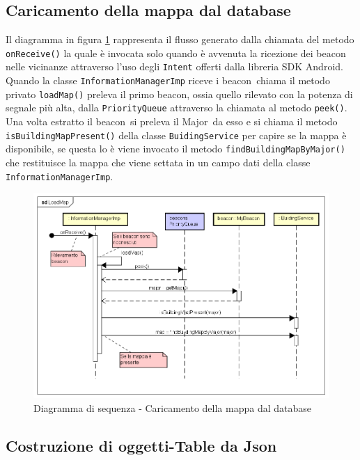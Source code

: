\documentclass[../DefinizioneDiProdotto.tex]{subfiles}
\begin{document}
	\newpage
	\subsection{Caricamento della mappa dal database}
		
		Il diagramma in figura \ref{fig:LoadMap} rappresenta il flusso generato dalla chiamata del metodo \verb|onReceive()| la quale è invocata solo quando è avvenuta la ricezione dei beacon nelle vicinanze attraverso l'uso degli \verb|Intent| offerti dalla libreria SDK Android. Quando la classe \verb|InformationManagerImp| riceve i beacon\g\ chiama il metodo privato \verb|loadMap()| preleva il primo beacon\g, ossia quello rilevato con la potenza di segnale più alta, dalla \verb|PriorityQueue| attraverso la chiamata al metodo \verb|peek()|. Una volta estratto il beacon\g\ si preleva il Major\g\ da esso e si chiama il metodo \verb|isBuildingMapPresent()| della classe \verb|BuidingService| per capire se la mappa è disponibile, se questa lo è viene invocato il metodo \verb|findBuildingMapByMajor()| che restituisce la mappa che viene settata in un campo dati della classe \verb|InformationManagerImp|.
		
		\begin{figure} [h]
			\centering
			\includegraphics[width=\textwidth]{diagrams/LoadMap}
			\caption{Diagramma di sequenza - Caricamento della mappa dal database}
			\label{fig:LoadMap}
		\end{figure}
		
	\newpage
	\subsection{Costruzione di oggetti-Table da Json}
	
\end{document}
